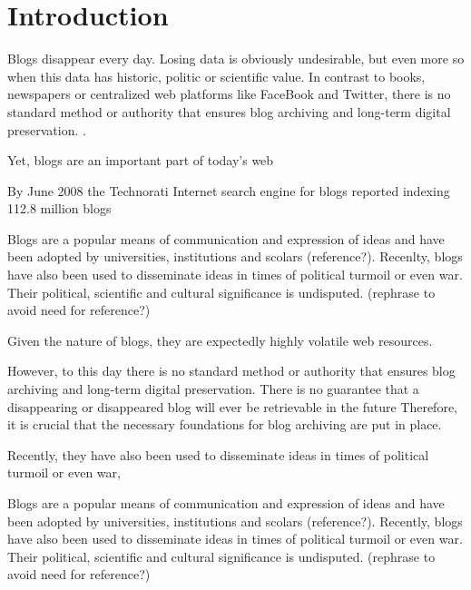 \section{Introduction}

Blogs disappear every day. Losing data is obviously undesirable, but even more so when this data has historic, politic or scientific value. In contrast to books, newspapers or centralized web platforms like FaceBook and Twitter, there is no standard method or authority that ensures blog archiving and long-term digital preservation. .

Yet, blogs are an important part of today's web

By June 2008 the Technorati Internet search engine for blogs reported indexing 112.8 million blogs \cite{technoratidata2008} 


Blogs are a popular means of communication and expression of ideas and have been adopted by universities, institutions and scolars (reference?). Recenlty, blogs have also been used to disseminate ideas in times of political turmoil or even war\cite{nahedeltantawy2012}. Their political, scientific and cultural significance is undisputed. (rephrase to avoid need for reference?)


Given the nature of blogs, they are expectedly highly volatile web resources.


However, to this day there is no standard method or authority that ensures blog archiving and long-term digital preservation. There is no guarantee that a disappearing or disappeared blog will ever be retrievable in the future \cite{anderson2012} Therefore, it is crucial that the necessary foundations for blog archiving are put in place.

Recently, they have also been used to disseminate ideas in times of political turmoil or even war\cite{nahedeltantawy2012}, 



Blogs are a popular means of communication and expression of ideas and have been adopted by universities, institutions and scolars (reference?). Recently, blogs have also been used to disseminate ideas in times of political turmoil or even war\cite{nahedeltantawy2012}. Their political, scientific and cultural significance is undisputed. (rephrase to avoid need for reference?)



